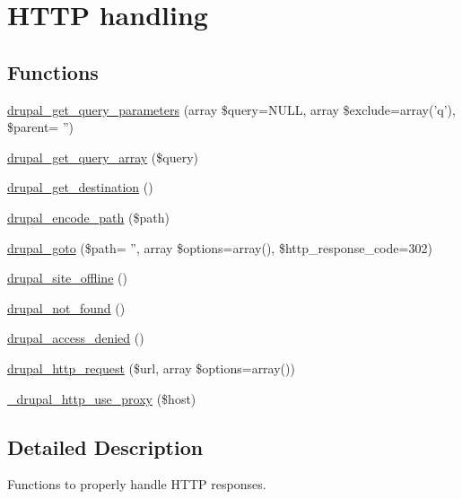 \hypertarget{group__http__handling}{
\section{HTTP handling}
\label{group__http__handling}
}
\subsection*{Functions}
\begin{DoxyCompactItemize}
\item 
\hyperlink{group__http__handling_ga2e632373cf469e513c0b6b7095f0e4dd}{drupal\_\-get\_\-query\_\-parameters} (array \$query=NULL, array \$exclude=array('q'), \$parent= '')
\item 
\hyperlink{group__http__handling_ga0ef58c019ee4bf4e1166e876f9721c12}{drupal\_\-get\_\-query\_\-array} (\$query)
\item 
\hyperlink{group__http__handling_ga0c95c16e75ac4df882686daccc1f8ac5}{drupal\_\-get\_\-destination} ()
\item 
\hyperlink{group__http__handling_gab333a51385bd4e339c464943553a6670}{drupal\_\-encode\_\-path} (\$path)
\item 
\hyperlink{group__http__handling_ga5b68d7a934713d1d623b2b32a732235d}{drupal\_\-goto} (\$path= '', array \$options=array(), \$http\_\-response\_\-code=302)
\item 
\hyperlink{group__http__handling_gafc3a1915f45be2ac8666778eef0e9758}{drupal\_\-site\_\-offline} ()
\item 
\hyperlink{group__http__handling_ga52b08cd98e1756326c1bd5b56c39a884}{drupal\_\-not\_\-found} ()
\item 
\hyperlink{group__http__handling_ga0bbff371f9373002e71f2e1347fcf481}{drupal\_\-access\_\-denied} ()
\item 
\hyperlink{group__http__handling_gaad3affacd718b960300dcdddefa518aa}{drupal\_\-http\_\-request} (\$url, array \$options=array())
\item 
\hyperlink{group__http__handling_gadfd5b8902a9838e814df472cdd930106}{\_\-drupal\_\-http\_\-use\_\-proxy} (\$host)
\end{DoxyCompactItemize}


\subsection{Detailed Description}
Functions to properly handle HTTP responses. 

